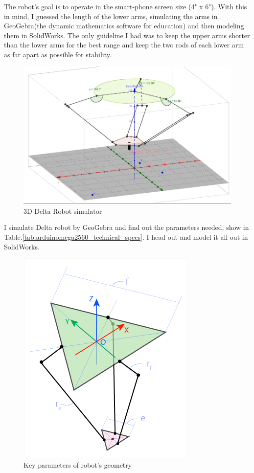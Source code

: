 The robot's goal is to operate in the smart-phone screen size (4" x 6"). With this in mind, I guessed the length of the lower arms, simulating the arms in GeoGebra\cite{GeoGebra_thesis}(the dynamic mathematics software for education) and then modeling them in SolidWorks. The only guideline I had was to keep the upper arms shorter than the lower arms for the best range and keep the two rods of each lower arm as far apart as possible for stability.
\begin{figure}[H]	
	\centering
	\includegraphics[width=\maxwidth{15cm}, keepaspectratio]{Chapters/Fig/3D_delta_robot_simulator.png}
	\caption{3D Delta Robot simulator\cite{GeoGebra_deltarobot_simulator_thesis}}
	\label{fig:3D_delta_robot_simulator}
\end{figure}

I simulate Delta robot by GeoGebra and find out the parameters needed, show in Table.\ref{tab:arduinomega2560_technical_specs}. I head out and model it all out in SolidWorks.
\begin{figure}[H]
	\centering
	\includegraphics[width=\maxwidth{15cm}, keepaspectratio]{Chapters/Fig/key_parameters.png}
	\caption{Key parameters of robot's geometry}
	\label{fig:key_parameters}
\end{figure}

